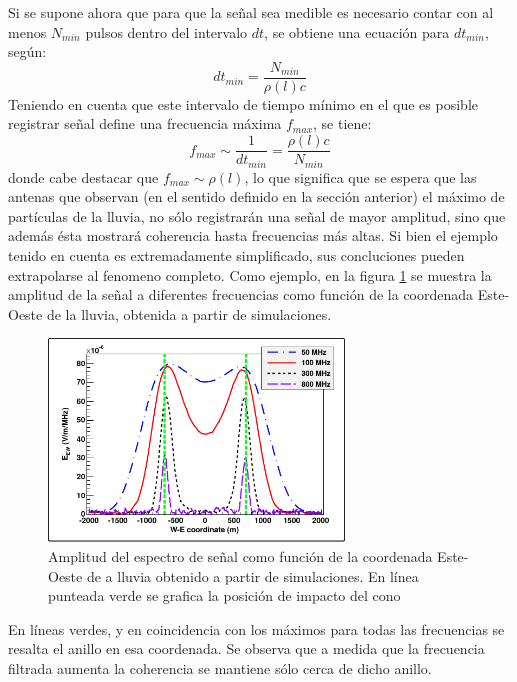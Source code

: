 	Si se supone ahora que para que la se\~nal sea medible es necesario contar con al menos $N_{min}$ pulsos dentro del intervalo $dt$, se obtiene una ecuaci\'on para $dt_{min}$, seg\'un:
	\begin{equation}
	 dt_{min} = \frac{N_{min}}{\rho(l) c}
	\end{equation}
	Teniendo en cuenta que este intervalo de tiempo m\'inimo en el que es posible registrar se\~nal define una frecuencia m\'axima $f_{max}$, se tiene:
	\begin{equation}
	 f_{max}\sim \frac{1}{dt_{min}} = \frac{\rho(l) c}{N_{min}}
	\end{equation}
	donde cabe destacar que $f_{max}\sim\rho(l)$, lo que significa que se espera que las antenas que observan (en el sentido definido en la secci\'on anterior) el m\'aximo de part\'iculas de la lluvia, no s\'olo registrar\'an una se\~nal de mayor amplitud, sino que adem\'as \'esta mostrar\'a coherencia hasta frecuencias m\'as altas.
	Si bien el ejemplo tenido en cuenta es extremadamente simplificado, sus concluciones pueden extrapolarse al fenomeno completo.
	Como ejemplo, en la figura \ref{fig:chConeSig} se muestra la amplitud de la señal a diferentes frecuencias como función de la coordenada Este-Oeste de la lluvia, obtenida a partir de simulaciones.
	\begin{figure}[ht!]
	\centering
		\includegraphics[width=0.7\textwidth]{fig/EASRadio/chConeSig}
		\caption{\label{fig:chConeSig} Amplitud del espectro de se\~nal como funci\'on de la coordenada Este-Oeste de a lluvia obtenido a partir de simulaciones. En l\'inea punteada verde se grafica la posici\'on de impacto del cono \cher{}}
	\end{figure}
	En l\'ineas verdes, y en coincidencia con los máximos para todas las frecuencias se resalta el anillo \cher{} en esa coordenada.
	Se observa que a medida que la frecuencia filtrada aumenta la coherencia se mantiene sólo cerca de dicho anillo.
	
